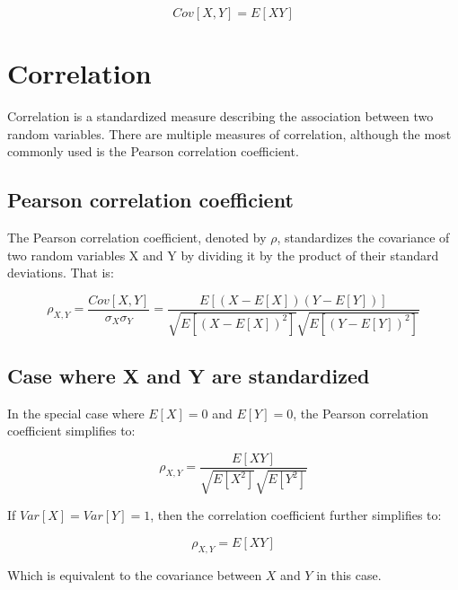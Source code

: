 \documentclass[12pt]{article}
\begin{document}
$$ Cov[X,Y] = E[XY] $$

\section{Correlation}

Correlation is a standardized measure describing the association between two random variables.
There are multiple measures of correlation, although the most commonly used is the Pearson correlation coefficient.

\subsection{Pearson correlation coefficient}

The Pearson correlation coefficient, denoted by $\rho$, standardizes the covariance of two random variables X and Y by dividing it by the product of their standard deviations. That is:

$$
\rho_{X,Y} =
\frac{Cov[X,Y]}{\sigma_X \sigma_Y} =
\frac{E[(X - E[X])(Y - E[Y])]}
{\sqrt{E[ (X - E[X])^2]} \sqrt{E[ (Y - E[Y])^2]}}
$$

\subsection{Case where X and Y are standardized}

In the special case where $E[X] = 0$ and $E[Y] = 0$, the Pearson correlation coefficient simplifies to:

$$ \rho_{X,Y} = \frac{E[XY]}{\sqrt{E[X^2]} \sqrt{E[Y^2]}} $$

If $ Var[X] = Var[Y] = 1$, then the correlation coefficient further simplifies to:

$$ \rho_{X,Y} = E[XY] $$

Which is equivalent to the covariance between $X$ and $Y$ in this case.
\end{document}
